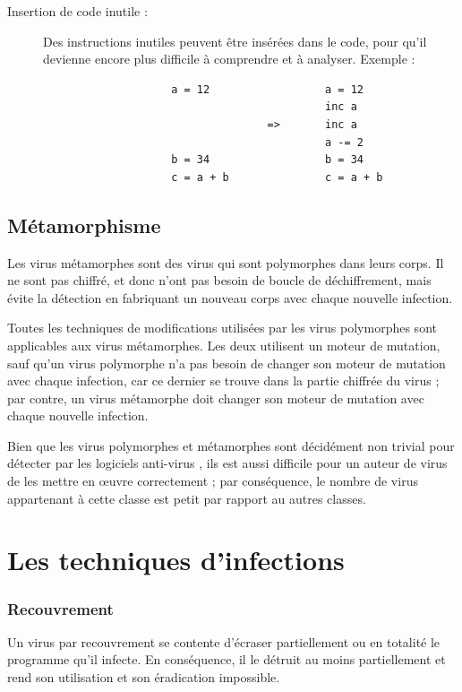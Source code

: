 \begin{description}
            \item[Insertion de code inutile :] Des instructions inutiles peuvent être insérées dans le code, pour qu'il
                devienne encore plus  difficile à comprendre et à analyser. Exemple :
                \begin{verbatim}
                    a = 12                  a = 12
                                            inc a
                                   =>       inc a
                                            a -= 2
                    b = 34                  b = 34
                    c = a + b               c = a + b
                \end{verbatim}
        \end{description}

    \subsection{Métamorphisme}
    Les virus métamorphes sont des virus qui sont polymorphes dans leurs corps. Il ne sont pas chiffré, et donc n'ont
    pas besoin de boucle de déchiffrement, mais évite la détection en fabriquant un nouveau corps avec chaque 
    nouvelle infection. \cite{virus}

    Toutes les techniques de modifications utilisées par les virus polymorphes sont applicables aux virus métamorphes. 
    Les deux utilisent un moteur de mutation, sauf qu'un virus polymorphe n'a pas besoin de changer son moteur de 
    mutation avec chaque infection, car ce dernier se trouve dans la partie chiffrée du virus ; par contre,
    un virus métamorphe doit changer son moteur de mutation avec chaque nouvelle infection.
    \cite{virus}

    Bien que les virus polymorphes et métamorphes sont décidément non trivial pour détecter par les logiciels anti-virus
    , ils est aussi difficile pour un auteur de virus de les mettre en œuvre correctement ; par conséquence, 
    le nombre de virus appartenant à cette classe est petit par rapport au autres classes. 
    \cite{virus}

\section{Les techniques d'infections}

        \subsubsection{Recouvrement}
        Un virus par recouvrement se contente d’écraser partiellement ou en totalité le programme 
        qu’il infecte. En conséquence, il le détruit au moins partiellement et rend son utilisation et 
        son éradication impossible. %

